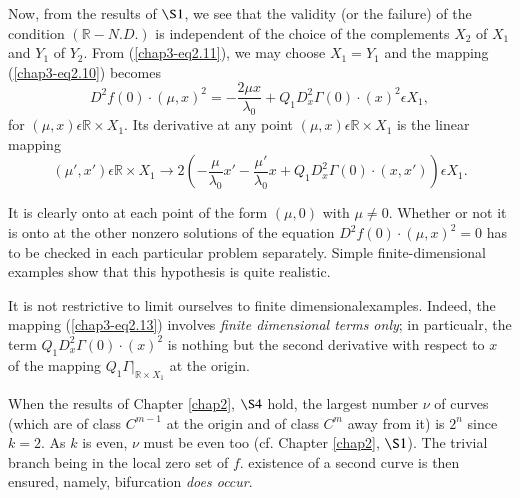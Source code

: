 Now, from the results of $\S 1$, we see that the validity (or the
failure) of the condition $(\mathbb{R}-N.D.)$ is independent of the
choice of the complements $X_{2}$ of $X_{1}$ and $Y_{1}$ of
$Y_{2}$. From (\ref{chap3-eq2.11}), we may choose $X_{1} = Y_{1}$ and
the mapping (\ref{chap3-eq2.10}) becomes
\begin{equation*}
D^{2}f(0) \cdot (\mu, x)^{2} = -\frac{2\mu x}{\lambda_{0}} +
Q_{1}D_{x}^{2}\Gamma(0) \cdot (x)^{2} \epsilon X_{1},\tag{2.13}\label{chap3-eq2.13}
\end{equation*}
for $(\mu, x) \epsilon \mathbb{R} \times X_{1}$. Its derivative at any
point $(\mu, x) \epsilon \mathbb{R} \times X_{1}$ is the linear
mapping
\begin{equation*}
(\mu', x') \epsilon \mathbb{R} \times X_{1} \to
  2\left(-\frac{\mu}{\lambda_{0}} x' - \frac{\mu'}{\lambda_{0}}x +
  Q_{1}D_{x}^{2}\Gamma(0) \cdot (x, x')\right) \epsilon X_{1}.\tag{2.14}\label{chap3-eq2.14}
\end{equation*}

It is clearly onto at each point of the form $(\mu, 0)$ with $\mu \neq
0$. Whether or not it is onto at the other nonzero solutions of the
equation $D^{2}f(0) \cdot (\mu, x)^{2} = 0$ has to be checked in each
particular problem separately. Simple finite-dimensional examples show
that this hypothesis is quite realistic.

\begin{remark}\label{chap3-rem2.2}
It is not restrictive to limit ourselves to finite
dimensional\pageoriginale examples. Indeed, the mapping
(\ref{chap3-eq2.13}) involves {\em finite dimensional terms only}; in
particualr, the term $Q_{1}D_{x}^{2}\Gamma(0) \cdot (x)^{2}$ is
nothing but the second derivative with respect to $x$ of the mapping
$Q_{1}\Gamma |_{\mathbb{R} \times X_{1}}$ at the origin.
\end{remark}

When the results of Chapter \ref{chap2}, $\S 4$ hold, the largest
number $\nu$ of curves (which are of class $C^{m-1}$ at the origin and
of class $C^{m}$ away from it) is $2^{n}$ since $k = 2$. As $k$ is even,
$\nu$ must be even too (cf. Chapter \ref{chap2}, $\S 1$). The trivial
branch being in the local zero set of $f$. existence of a second curve is
then ensured, namely, bifurcation {\em does occur}.

